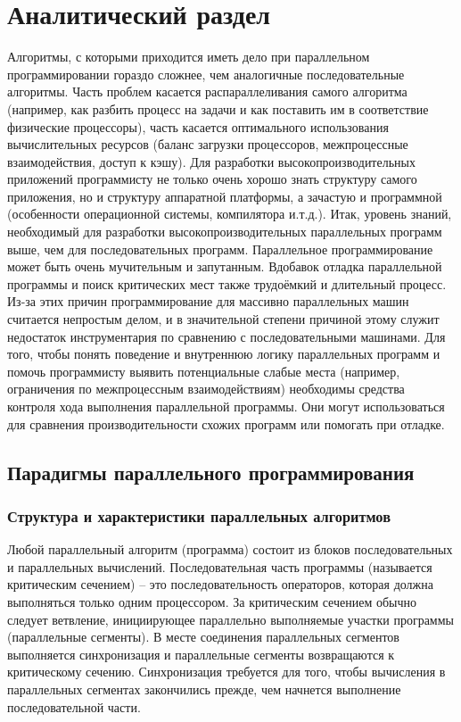 \chapter{Аналитический раздел}
\label{cha:analysis}
%
%
Алгоритмы, с которыми приходится иметь дело при параллельном программировании гораздо сложнее, чем аналогичные последовательные алгоритмы. Часть проблем касается распараллеливания самого алгоритма (например, как разбить процесс на задачи и как поставить им в соответствие физические процессоры), часть касается оптимального использования вычислительных ресурсов (баланс загрузки процессоров, межпроцессные взаимодействия, доступ к кэшу). Для разработки высокопроизводительных приложений программисту не только очень хорошо знать структуру самого приложения, но и структуру аппаратной платформы, а зачастую и программной (особенности операционной системы, компилятора и.т.д.).
Итак, уровень знаний, необходимый для разработки высокопроизводительных параллельных программ выше, чем для последовательных программ. Параллельное программирование может быть очень мучительным и запутанным. Вдобавок отладка параллельной программы и поиск критических мест также трудоёмкий и длительный процесс.
Из-за этих причин программирование для массивно параллельных машин считается непростым делом, и в значительной степени причиной этому служит недостаток инструментария по сравнению с последовательными машинами. Для того, чтобы понять поведение и внутреннюю логику параллельных программ и помочь программисту выявить потенциальные слабые места (например, ограничения по межпроцессным взаимодействиям) необходимы средства контроля хода выполнения параллельной программы. Они могут использоваться для сравнения производительности схожих программ или помогать при отладке.





\section{Парадигмы параллельного программирования}
\subsection{Структура и характеристики параллельных алгоритмов}
Любой параллельный алгоритм (программа) состоит из блоков последовательных и параллельных вычислений. Последовательная часть программы (называется критическим сечением) – это последовательность операторов, которая должна выполняться только одним процессором. За критическим сечением обычно следует ветвление, инициирующее параллельно выполняемые участки программы (параллельные сегменты). В месте соединения параллельных сегментов выполняется синхронизация и параллельные сегменты возвращаются к критическому сечению. Синхронизация требуется для того, чтобы вычисления в параллельных сегментах закончились прежде, чем начнется выполнение последовательной части. 

